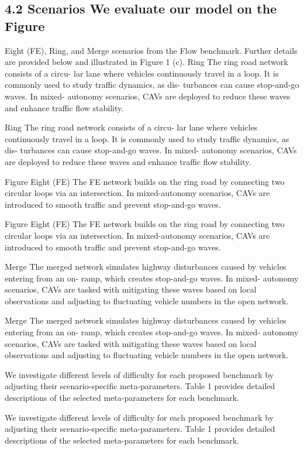 \documentclass[12pt]{article}
\begin{document}
\subsection{4.2 Scenarios We evaluate our model on the Figure}

Eight (FE), Ring, and Merge scenarios from the Flow
benchmark. Further details are provided below and
illustrated in Figure 1 (c).
Ring The ring road network consists of a circu-
lar lane where vehicles continuously travel in a loop.
It is commonly used to study traffic dynamics, as dis-
turbances can cause stop-and-go waves.
In mixed-
autonomy scenarios, CAVs are deployed to reduce these
waves and enhance traffic flow stability.


Ring The ring road network consists of a circu-
lar lane where vehicles continuously travel in a loop.
It is commonly used to study traffic dynamics, as dis-
turbances can cause stop-and-go waves.
In mixed-
autonomy scenarios, CAVs are deployed to reduce these
waves and enhance traffic flow stability.


Figure Eight (FE) The FE network builds on
the ring road by connecting two circular loops via an
intersection.
In mixed-autonomy scenarios, CAVs are
introduced to smooth traffic and prevent stop-and-go
waves.


Figure Eight (FE) The FE network builds on
the ring road by connecting two circular loops via an
intersection.
In mixed-autonomy scenarios, CAVs are
introduced to smooth traffic and prevent stop-and-go
waves.


Merge The merged network simulates highway
disturbances caused by vehicles entering from an on-
ramp, which creates stop-and-go waves.
In mixed-
autonomy scenarios, CAVs are tasked with mitigating
these waves based on local observations and adjusting
to fluctuating vehicle numbers in the open network.


Merge The merged network simulates highway
disturbances caused by vehicles entering from an on-
ramp, which creates stop-and-go waves.
In mixed-
autonomy scenarios, CAVs are tasked with mitigating
these waves based on local observations and adjusting
to fluctuating vehicle numbers in the open network.


We investigate different levels of difficulty for each
proposed benchmark by adjusting their scenario-specific
meta-parameters. Table 1 provides detailed descriptions
of the selected meta-parameters for each benchmark.


We investigate different levels of difficulty for each
proposed benchmark by adjusting their scenario-specific
meta-parameters. Table 1 provides detailed descriptions
of the selected meta-parameters for each benchmark.
\end{document}
